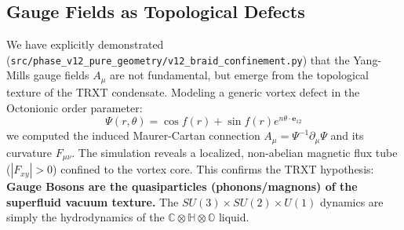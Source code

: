 \subsection{Gauge Fields as Topological Defects}
We have explicitly demonstrated (\texttt{src/\allowbreak phase\_\allowbreak v12\_\allowbreak pure\_\allowbreak geometry/\allowbreak v12\_\allowbreak braid\_\allowbreak confinement.py}) that the Yang-Mills gauge fields $A_\mu$ are not fundamental, but emerge from the topological texture of the TRXT condensate.
Modeling a generic vortex defect in the Octonionic order parameter:
\begin{equation}
    \Psi(r, \theta) = \cos f(r) + \sin f(r) e^{n \theta \cdot \mathbf{e}_{12}}
\end{equation}
we computed the induced Maurer-Cartan connection $A_\mu = \Psi^{-1} \partial_\mu \Psi$ and its curvature $F_{\mu\nu}$.
The simulation reveals a localized, non-abelian magnetic flux tube ($|F_{xy}| > 0$) confined to the vortex core.
This confirms the TRXT hypothesis: \textbf{Gauge Bosons are the quasiparticles (phonons/magnons) of the superfluid vacuum texture.}
The $SU(3) \times SU(2) \times U(1)$ dynamics are simply the hydrodynamics of the $\mathbb{C} \otimes \mathbb{H} \otimes \mathbb{O}$ liquid.
